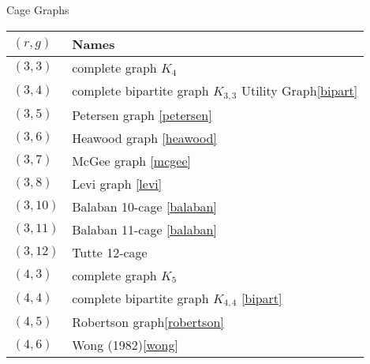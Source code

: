 \begin{NewMacroBox}{Cage Graphs}{}
\medskip
\begin{tabular}{ll}
  \bottomrule
$(r,g)$ & Names                                                     \\
\midrule
$(3,3)$     & complete graph $K_4$                                  \\
$(3,4)$     & complete bipartite graph $K_{3,3}$ Utility Graph\ref{bipart} \\
$(3,5)$     & Petersen graph \ref{petersen}                          \\
$(3,6)$     & Heawood graph  \ref{heawood}                           \\
$(3,7)$     & McGee graph \ref{mcgee}                                \\
$(3,8)$     & Levi graph \ref{levi}                                  \\
$(3,10)$    & Balaban 10-cage     \ref{balaban}                      \\
$(3,11)$    & Balaban 11-cage     \ref{balaban}                      \\
$(3,12)$    & Tutte 12-cage                                          \\
$(4,3)$     & complete graph $K_5$                                   \\
$(4,4)$     & complete bipartite graph $K_{4,4}$ \ref{bipart}          \\
$(4,5)$     & Robertson graph\ref{robertson}                         \\
$(4,6)$     & Wong (1982)\ref{wong}                                  \\
\end{tabular}
\end{NewMacroBox}

\endinput